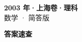 \documentclass[zihao=-4, a4paper]{ctexart}
\begin{document}
\begin{center}
  {\Large\bfseries 2003 年·上海卷·理科}\\[4pt]
  {\large 数学 · 简答版}
\end{center}
\medskip
{}

\clearpage
{}
\begin{center}{\Large\bfseries 答案速查}\end{center}
\medskip

\end{document}
